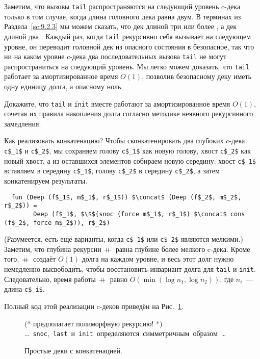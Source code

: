 Заметим, что вызовы \lstinline!tail! распространяются на следующий
уровень c-дека только в том случае, когда длина головного дека равна
двум. В терминах из Раздела~\ref{sc:9.2.3} мы можем сказать, что дек
длиной три или более , а дек длиной два
.  Каждый раз, когда \lstinline!tail!
рекурсивно себя вызывает на следующем уровне, он переводит головной
дек из опасного состояния в безопасное, так что ни на каком уровне
c-дека два последовательных вызова \lstinline!tail! не могут
распространиться на следующий уровень. Мы легко можем доказать, что
\lstinline!tail! работает за амортизированное время $O(1)$, позволив
безопасному деку иметь одну единицу долга, а опасному ноль.

\begin{exercise}\label{ex:11.3}
  Докажите, что \lstinline!tail! и \lstinline!init! вместе работают за
  амортизированное время $O(1)$, сочетая их правила накопления долга
  согласно методике неявного рекурсивного замедления.
\end{exercise}

Как реализовать конкатенацию? Чтобы сконкатенировать два глубоких
c-дека \lstinline!c$_1$! и \lstinline!c$_2$!, мы сохраняем голову
\lstinline!c$_1$! как новую голову, хвост \lstinline!c$_2$! как новый
хвост, а из оставшихся элементов собираем новую середину: хвост
\lstinline!c$_1$! вставляем в середину \lstinline!c$_1$!, голову
\lstinline!c$_2$! в середину \lstinline!c$_2$!, а затем конкатенируем
результаты.
\begin{lstlisting}
  fun (Deep (f$_1$, m$_1$, r$_1$)) $\concat$ (Deep (f$_2$, m$_2$, r$_2$)) =
        Deep (f$_1$, $\$$(snoc (force m$_1$, r$_1$) $\concat$ cons (f$_2$, force m$_2$)), r$_2$)
\end{lstlisting}
(Разумеется, есть ещё варианты, когда \lstinline!c$_1$! или
\lstinline!c$_2$! являются мелкими.) Заметим, что глубина рекурсии
$+\!\!\!+\,$ равна глубине более мелкого c-дека. Кроме того, $+\!\!\!+\,$
создаёт $O(1)$ долга на каждом уровне, и весь этот долг нужно
немедленно высвободить, чтобы восстановить инвариант долга для
\lstinline!tail! и \lstinline!init!. Следовательно, время работы
$+\!\!\!+\,$ равно $O(\min (\log n_1, \log n_2))$, где $n_i$~--- длина
\lstinline!c$_i$!.

Полный код этой реализации c-деков приведён на Рис.~\ref{fig:11.3}.

\begin{figure}
  \centering
  (* $\mbox{предполагает полиморфную рекурсию!}$ *)  \\
  \mbox{\ldots{} \lstinline!snoc!, \lstinline!last! и \lstinline!init!
    определяются симметричным образом \ldots}\\

  \caption{Простые деки с конкатенацией.}
  \label{fig:11.3}
\end{figure}

